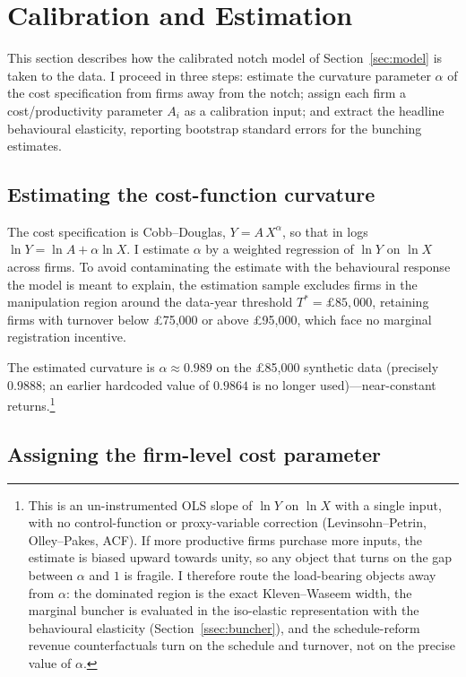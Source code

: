 \section{Calibration and Estimation}
\label{sec:calibration}

This section describes how the calibrated notch model of Section~\ref{sec:model}
is taken to the data. I proceed in three steps: estimate the curvature
parameter $\alpha$ of the cost specification from firms away from the notch;
assign each firm a cost/productivity parameter $A_i$ as a calibration input; and
extract the headline behavioural elasticity, reporting bootstrap standard errors
for the bunching estimates.

\subsection{Estimating the cost-function curvature}

The cost specification is Cobb--Douglas, $Y = A\,X^{\alpha}$, so that in logs
\(\ln Y = \ln A + \alpha \ln X\). I estimate $\alpha$ by a weighted regression
of $\ln Y$ on $\ln X$ across firms. To avoid contaminating the estimate with the
behavioural response the model is meant to explain, the estimation sample excludes
firms in the manipulation region around the data-year threshold
$T^{*}=\pounds85{,}000$, retaining firms with turnover below \pounds75{,}000 or
above \pounds95{,}000, which face no marginal registration incentive.

The estimated curvature is $\alpha \approx 0.989$ on the \pounds85{,}000 synthetic
data (precisely $0.9888$; an earlier hardcoded value of $0.9864$ is no longer
used)---near-constant returns.\footnote{This is an un-instrumented OLS slope of
$\ln Y$ on $\ln X$ with a single input, with no control-function or
proxy-variable correction (Levinsohn--Petrin, Olley--Pakes, ACF). If more
productive firms purchase more inputs, the estimate is biased upward towards
unity, so any object that turns on the gap between $\alpha$ and $1$ is fragile.
I therefore route the load-bearing objects away from $\alpha$: the dominated
region is the exact Kleven--Waseem width, the marginal buncher is evaluated in the
iso-elastic representation with the behavioural elasticity
(Section~\ref{ssec:buncher}), and the schedule-reform revenue counterfactuals turn
on the schedule and turnover, not on the precise value of $\alpha$.}

\subsection{Assigning the firm-level cost parameter}

